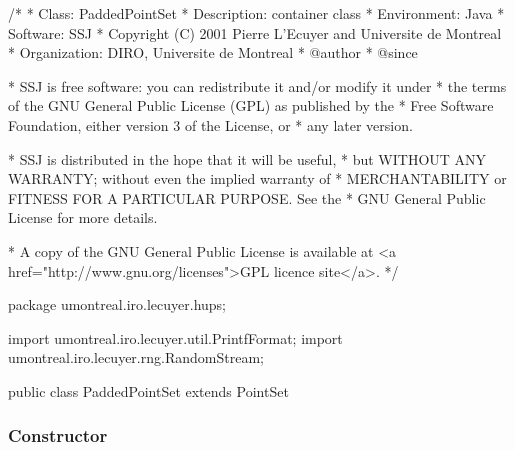 \begin{code}\begin{hide}
/*
 * Class:        PaddedPointSet
 * Description:  container class
 * Environment:  Java
 * Software:     SSJ 
 * Copyright (C) 2001  Pierre L'Ecuyer and Universite de Montreal
 * Organization: DIRO, Universite de Montreal
 * @author       
 * @since

 * SSJ is free software: you can redistribute it and/or modify it under
 * the terms of the GNU General Public License (GPL) as published by the
 * Free Software Foundation, either version 3 of the License, or
 * any later version.

 * SSJ is distributed in the hope that it will be useful,
 * but WITHOUT ANY WARRANTY; without even the implied warranty of
 * MERCHANTABILITY or FITNESS FOR A PARTICULAR PURPOSE.  See the
 * GNU General Public License for more details.

 * A copy of the GNU General Public License is available at
   <a href="http://www.gnu.org/licenses">GPL licence site</a>.
 */
\end{hide}
package umontreal.iro.lecuyer.hups;\begin{hide}

import umontreal.iro.lecuyer.util.PrintfFormat;
import umontreal.iro.lecuyer.rng.RandomStream;\end{hide}
 
public class PaddedPointSet extends PointSet \begin{hide} {
   protected int curPointSets = 0;     // Current number of padded point sets.
   protected int maxPointSets;         // Max. number of padded point sets.
   protected PointSet pointSet[];      // List of padded point sets
   protected int startDim[];           // Starting dim. for padded points sets.
   protected int permutation[][];      // One permutation for each point set.

\end{hide}
\end{code}

\subsubsection*{Constructor}


